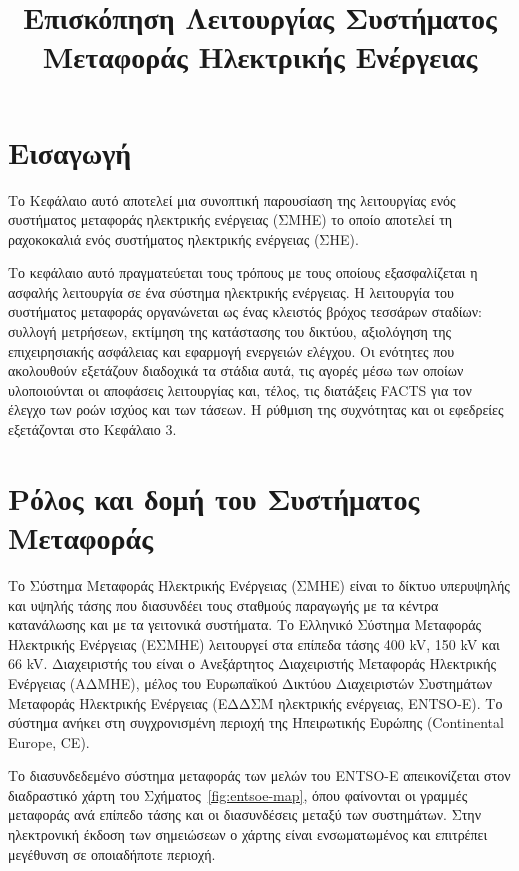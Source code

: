 \title{Επισκόπηση Λειτουργίας Συστήματος Μεταφοράς Ηλεκτρικής Ενέργειας}

\section{Εισαγωγή}
\label{kef-01-theoria}

Το Κεφάλαιο αυτό αποτελεί μια συνοπτική παρουσίαση της λειτουργίας ενός συστήματος μεταφοράς ηλεκτρικής ενέργειας (ΣΜΗΕ) το οποίο αποτελεί τη ραχοκοκαλιά ενός συστήματος ηλεκτρικής ενέργειας (ΣΗΕ). 




Το κεφάλαιο αυτό πραγματεύεται τους τρόπους με τους οποίους εξασφαλίζεται η ασφαλής λειτουργία σε ένα σύστημα ηλεκτρικής ενέργειας. Η λειτουργία του συστήματος μεταφοράς οργανώνεται ως ένας
κλειστός βρόχος τεσσάρων σταδίων: συλλογή μετρήσεων, εκτίμηση της κατάστασης του δικτύου,
αξιολόγηση της επιχειρησιακής ασφάλειας και εφαρμογή ενεργειών ελέγχου. Οι ενότητες που
ακολουθούν εξετάζουν διαδοχικά τα στάδια αυτά, τις αγορές μέσω των οποίων υλοποιούνται οι
αποφάσεις λειτουργίας και, τέλος, τις διατάξεις FACTS για τον έλεγχο των ροών ισχύος και των
τάσεων. Η ρύθμιση της συχνότητας και οι εφεδρείες εξετάζονται στο Κεφάλαιο 3.


\section{Ρόλος και δομή του Συστήματος Μεταφοράς}

Το Σύστημα Μεταφοράς Ηλεκτρικής Ενέργειας (ΣΜΗΕ) είναι το δίκτυο υπερυψηλής και υψηλής
τάσης που διασυνδέει τους σταθμούς παραγωγής με τα κέντρα κατανάλωσης και με τα γειτονικά
συστήματα. Το Ελληνικό Σύστημα Μεταφοράς Ηλεκτρικής Ενέργειας (ΕΣΜΗΕ) λειτουργεί στα επίπεδα
τάσης 400 kV, 150 kV και 66 kV. Διαχειριστής του είναι ο Ανεξάρτητος Διαχειριστής Μεταφοράς
Ηλεκτρικής Ενέργειας (ΑΔΜΗΕ), μέλος του Ευρωπαϊκού Δικτύου Διαχειριστών Συστημάτων Μεταφοράς
Ηλεκτρικής Ενέργειας (ΕΔΔΣΜ ηλεκτρικής ενέργειας, ENTSO-E). Το σύστημα ανήκει στη
συγχρονισμένη περιοχή της Ηπειρωτικής Ευρώπης (Continental Europe, CE).

Το διασυνδεδεμένο σύστημα μεταφοράς των μελών του ENTSO-E απεικονίζεται στον διαδραστικό
χάρτη του Σχήματος~\ref{fig:entsoe-map}, όπου φαίνονται οι γραμμές μεταφοράς ανά επίπεδο
τάσης και οι διασυνδέσεις μεταξύ των συστημάτων. Στην ηλεκτρονική έκδοση των σημειώσεων ο
χάρτης είναι ενσωματωμένος και επιτρέπει μεγέθυνση σε οποιαδήποτε περιοχή.



